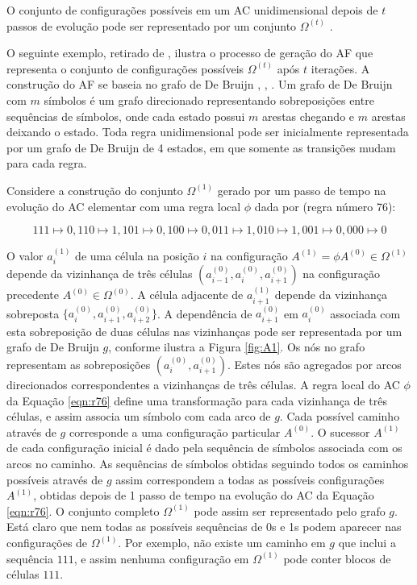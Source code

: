 \documentclass[12pt,a4paper]{article}
\begin{document}
O conjunto de configurações possíveis em um AC unidimensional depois de $t$
passos de evolução pode ser representado por um conjunto $\Omega^{(t)}$
.

O seguinte exemplo, retirado de , ilustra o processo de
geração do AF que representa o conjunto de configurações
possíveis $\Omega^{(t)}$ após $t$ iterações. A construção do AF se baseia no
grafo de De Bruijn , ,
. Um grafo de De Bruijn com $m$ símbolos
é um grafo direcionado representando sobreposições entre sequências de símbolos,
onde cada estado possui $m$ arestas chegando e $m$ arestas deixando o estado.
Toda regra unidimensional pode ser inicialmente representada por um grafo de De
Bruijn de 4 estados, em que somente as transições mudam para cada regra.

Considere a construção do conjunto $\Omega^{(1)}$ gerado por um passo de
tempo na evolução do AC elementar com uma regra
local $\phi$ dada por (regra número 76):

\begin{equation}\label{eqn:r76}
111 \mapsto 0, 110 \mapsto 1, 101 \mapsto 0, 100 \mapsto 0, 011 \mapsto 1, 010 \mapsto 1,
001 \mapsto 0, 000 \mapsto 0
\end{equation}

O valor $a_i^{(1)}$ de uma célula na posição $i$ na configuração
$A^{(1)} = \phi A^{(0)} \in \Omega^{(1)}$ depende da vizinhança de três
células $(a_{i-1}^{(0)},a_i^{(0)},a_{i+1}^{(0)})$ na configuração precedente
$A^{(0)} \in \Omega^{(0)}$. A célula adjacente de $a_{i+1}^{(1)}$ depende da
vizinhança sobreposta $\{a_i^{(0)},a_{i+1}^{(0)},a_{i+2}^{(0)}\}$. A
dependência de $a_{i+1}^{(0)}$ em $a_i^{(0)}$ associada com esta sobreposição
de duas células nas vizinhanças pode ser representada por um grafo de
De Bruijn $g$, conforme
ilustra a Figura \ref{fig:A1}. Os nós no grafo representam as sobreposições
$(a_i^{(0)},a_{i+1}^{(0)})$. Estes nós são agregados por arcos direcionados
correspondentes a vizinhanças de três células. A regra local do AC
$\phi$ da Equação \ref{eqn:r76} define uma transformação para cada
vizinhança de três células, e assim associa um símbolo com cada arco de $g$.
Cada possível caminho através de $g$ corresponde a uma configuração particular
$A^{(0)}$. O sucessor $A^{(1)}$ de cada configuração inicial é dado pela
sequência de símbolos associada com os arcos no caminho. As sequências de
símbolos obtidas seguindo todos os caminhos possíveis através de $g$ assim
correspondem a todas as possíveis configurações $A^{(1)}$, obtidas depois
de 1 passo de tempo na evolução do AC da Equação \ref{eqn:r76}. O
conjunto completo $\Omega^{(1)}$ pode assim ser representado pelo grafo
$g$. Está claro que nem todas as possíveis sequências de 0s e 1s podem
aparecer nas configurações de $\Omega^{(1)}$. Por exemplo, não existe um
caminho em $g$ que inclui a sequência $111$, e assim nenhuma
configuração em $\Omega^{(1)}$ pode conter blocos de células $111$.
\end{document}
